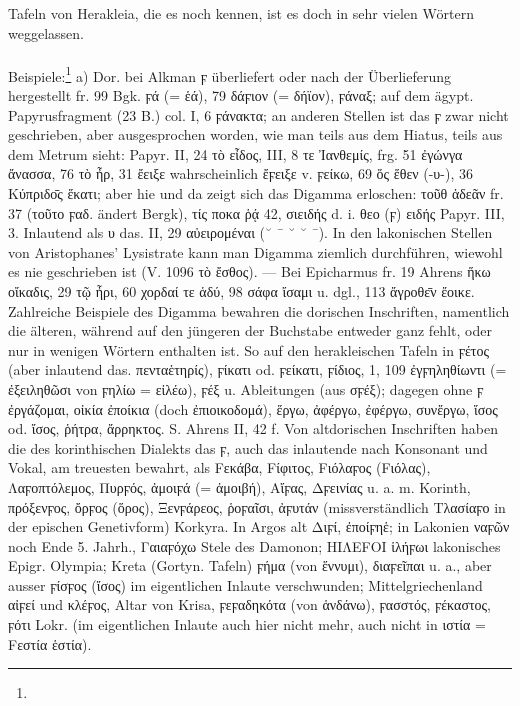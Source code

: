 Tafeln von Herakleia, die es noch kennen, ist es doch in sehr vielen Wörtern weggelassen. 

\paragraph{} Beispiele:\footnote{} a) Dor. bei Alkman ϝ überliefert oder nach der Überlieferung hergestellt fr. 99 Bgk. ϝά (= ἑά), 79 δάϝιον (= δήϊον), ϝάναξ; auf dem ägypt. Papyrusfragment (23 B.) col. I, 6 ϝάνακτα; an anderen Stellen ist das ϝ zwar nicht geschrieben, aber ausgesprochen worden, wie man teils aus dem Hiatus, teils aus dem Metrum sieht: Papyr. II, 24 τὸ εἶδος, III, 8 τε Ἰανθεμίς, frg. 51 ἐγώνγα ἄνασσα, 76 τὸ ἦρ, 31 ἔειξε wahrscheinlich ἔϝειξε v. ϝείκω, 69 ὅς ἕθεν (-υ-), 36 Κύπριδο̄ς ἕκατι; aber hie und da zeigt sich das Digamma erloschen: τοῦθ ἁδεᾶν fr. 37 (τοῦτο ϝαδ. ändert Bergk), τίς ποκα ῥᾴ 42, σιειδής d. i. θεο (ϝ) ειδής Papyr. III, 3. Inlautend als υ das. II, 29 αὐειρομέναι (˘ ¯ ˘ ˘ ¯). In den lakonischen Stellen von Aristophanes' Lysistrate kann man Digamma ziemlich durchführen, wiewohl es nie geschrieben ist (V. 1096 τὸ ἔσθος). — Bei Epicharmus fr. 19 Ahrens ἥκω οἴκαδις, 29 τῷ ἦρι, 60 χορδαί τε ἁδύ, 98 σάφα ἴσαμι u. dgl., 113 ἄγροθε̄ν ἔοικε. Zahlreiche Beispiele des Digamma bewahren die dorischen Inschriften, namentlich die älteren, während auf den jüngeren der Buchstabe entweder ganz fehlt, oder nur in wenigen Wörtern enthalten ist. So auf den herakleischen Tafeln in ϝέτος (aber inlautend das. πενταἑτηρίς), ϝίκατι od. ϝείκατι, ϝίδιος, 1, 109 ἐγϝηληθίωντι (= ἐξειληθῶσι von ϝηλίω = εἰλέω), ϝέξ u. Ableitungen (aus σϝέξ); dagegen ohne ϝ ἐργάζομαι, οἰκία ἐποίκια (doch ἐπιοικοδομά), ἕργω, ἀφέργω, ἐφέργω, συνἕργω, ἵσος od. ἴσος, ῥήτρα, ἄρρηκτος. S. Ahrens II, 42 f. Von altdorischen Inschriften haben die des korinthischen Dialekts das ϝ, auch das inlautende nach Konsonant und Vokal, am treuesten bewahrt, als Fεκάβα, Fίφιτος, Fιόλαϝος (Fιόλας), Λαϝοπτόλεμος, Πυρϝός, ἀμοιϝά (= ἀμοιβή), Αἴϝας, Δϝεινίας u. a. m. Korinth, πρόξενϝος, ὄρϝος (ὅρος), Ξενϝάρεος, ῥοϝαῖσι, ἀϝυτάν (missverständlich Τλασίαϝο in der epischen Genetivform) Korkyra. In Argos alt Διϝί, ἐποίϝηἑ; in Lakonien ναϝῶν noch Ende 5. Jahrh., Γαιαϝόχω Stele des Damonon; ΗΙΛΕFΟΙ ἱλήϝωι lakonisches Epigr. Olympia; Kreta (Gortyn. Tafeln) ϝήμα (von ἕννυμι), διαϝεῖπαι u. a., aber ausser ϝίσϝος (ἴσος) im eigentlichen Inlaute verschwunden; Mittelgriechenland αἰϝεί und κλέϝος, Altar von Krisa, ϝεϝαδηκότα (von ἁνδάνω), ϝασστός, ϝέκαστος, ϝότι Lokr. (im eigentlichen Inlaute auch hier nicht mehr, auch nicht in ιστία = Fεστία ἑστία). 

